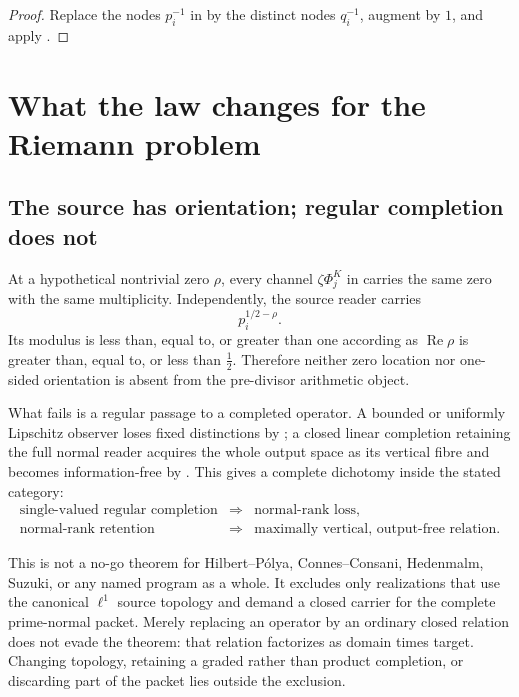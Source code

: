\documentclass[11pt]{article}
\theoremstyle{definition}
\theoremstyle{remark}
\newcommand{\Rea}{\operatorname{Re}}
\begin{document}
\begin{proof}
Replace the nodes \(p_i^{-1}\) in  by the distinct
nodes \(q_i^{-1}\), augment by \(1\), and apply
.
\end{proof}

\section{What the law changes for the Riemann problem}

\subsection{The source has orientation; regular completion does not}

At a hypothetical nontrivial zero \(\rho\), every channel
\(\zeta\Phi^K_j\) in  carries the same zero with
the same multiplicity.  Independently, the source reader carries
\[
                         p_i^{1/2-\rho}.
\tag{6.1}\label{eq:zero-character}
\]
Its modulus is less than, equal to, or greater than one according as
\(\Rea\rho\) is greater than, equal to, or less than \(\tfrac12\).
Therefore neither zero location nor one-sided orientation is absent from
the pre-divisor arithmetic object.

What fails is a regular passage to a completed operator.  A bounded or
uniformly Lipschitz observer loses fixed distinctions by
; a closed linear completion retaining the full normal
reader acquires the whole output space as its vertical fibre and becomes
information-free by .  This gives a
complete dichotomy inside the stated category:
\[
\boxed{
\begin{array}{ccl}
\text{single-valued regular completion}
   &\Longrightarrow& \text{normal-rank loss},\\[2mm]
\text{normal-rank retention}
   &\Longrightarrow& \text{maximally vertical, output-free relation}.
\end{array}}
\tag{6.2}\label{eq:completion-dichotomy}
\]

This is not a no-go theorem for Hilbert--P\'olya, Connes--Consani,
Hedenmalm, Suzuki, or any named program as a whole.  It excludes only
realizations that use the canonical \(\ell^1\) source topology and demand a
closed carrier for the complete prime-normal packet.  Merely replacing an
operator by an ordinary closed relation does not evade the theorem: that
relation factorizes as domain times target.  Changing topology, retaining a
graded rather than product completion, or discarding part of the packet lies
outside the exclusion.
\end{document}
